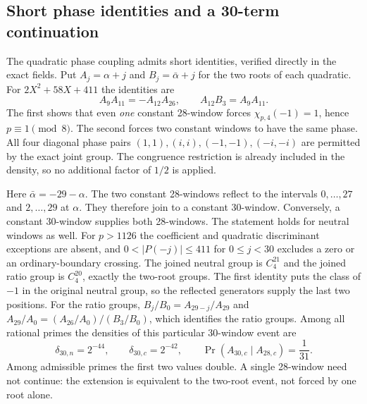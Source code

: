 \documentclass[11pt]{article}
\theoremstyle{definition}\newtheorem{definition}[theorem]{Definition}
\newcommand{\Prob}{\operatorname{Pr}}
\begin{document}
\subsection{Short phase identities and a 30-term continuation}
The quadratic phase coupling admits short identities, verified
directly in the exact fields. Put $A_j=\alpha+j$ and
$B_j=\bar\alpha+j$ for the two roots of each quadratic.
For $2X^2+58X+411$ the identities are
\[
 A_9A_{11}=-A_{12}A_{26},\qquad
 A_{12}B_3=A_9A_{11}.
\]
The first shows that even \emph{one} constant 28-window forces
$\chi_{p,4}(-1)=1$, hence $p\equiv1\pmod8$.
The second forces two constant windows to have the same phase.
All four diagonal phase pairs $(1,1),(i,i),(-1,-1),(-i,-i)$
are permitted by the exact joint group. The congruence restriction
is already included in the density, so no additional factor of
$1/2$ is applied.

Here $\bar\alpha=-29-\alpha$. The two constant 28-windows
reflect to the intervals $0,\ldots,27$ and $2,\ldots,29$ at
$\alpha$. They therefore join to a constant 30-window.
Conversely, a constant 30-window supplies both 28-windows.
The statement holds for neutral windows as well.
For $p>1126$ the coefficient and quadratic discriminant
exceptions are absent, and $0<|P(-j)|\le411$ for $0\le j<30$
excludes a zero or an ordinary-boundary crossing.
The joined neutral group is $C_4^{21}$ and the joined ratio
group is $C_4^{20}$, exactly the two-root groups. The first
identity puts the class of $-1$ in the original neutral group,
so the reflected generators supply the last two positions.
For the ratio groups,
$B_j/B_0=A_{29-j}/A_{29}$ and
$A_{29}/A_0=(A_{26}/A_0)/(B_3/B_0)$, which identifies the
ratio groups. Among all rational primes the densities of this
particular 30-window event are
\[
 \delta_{30,n}=2^{-44},\qquad
 \delta_{30,c}=2^{-42},\qquad
 \Prob(A_{30,c}\mid A_{28,c})=\frac1{31}.
\]
Among admissible primes the first two values double.
A single 28-window need not continue: the extension is
equivalent to the two-root event, not forced by one root alone.
\end{document}
